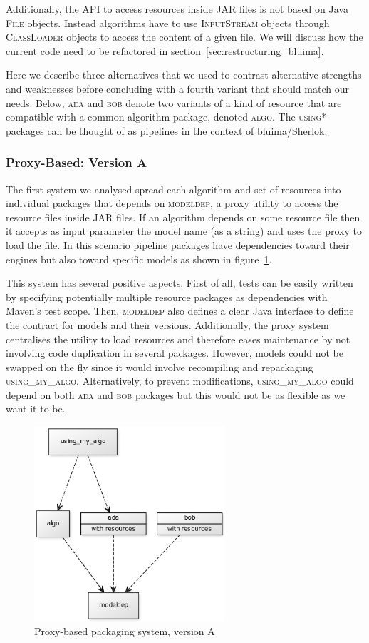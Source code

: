 \documentclass{article}
\newcommand{\ID}[1]{{\textsc{#1}}}
\newcommand{\JAR}{JAR\xspace}
\begin{document}
\begin{appendices}
Additionally, the API to access resources inside \JAR files is not based on Java \ID{File} objects.
Instead algorithms have to use \ID{InputStream} objects through \ID{ClassLoader} objects to access
the content of a given file. We will discuss how the current code need to be refactored in
section~\ref{sec:restructuring_bluima}.

Here we describe three alternatives that we used to contrast alternative strengths and weaknesses
before concluding with a fourth variant that should match our needs. Below, \ID{ada} and \ID{bob}
denote two variants of a kind of resource that are compatible with a common algorithm package,
denoted \ID{algo}. The \ID{using*} packages can be thought of as pipelines in the context of
bluima/Sherlok.

\subsubsection{Proxy-Based: Version A}

The first system we analysed spread each algorithm and set of resources into individual packages
that depends on \ID{modeldep}, a proxy utility to access the resource files inside \JAR files. If an
algorithm depends on some resource file then it accepts as input parameter the model name (as a
string) and uses the proxy to load the file. In this scenario pipeline packages have dependencies
toward their engines but also toward specific models as shown in figure~\ref{fig:pkgsysA}.

This system has several positive aspects. First of all, tests can be easily written by specifying
potentially multiple resource packages as dependencies with Maven's test scope. Then, \ID{modeldep}
also defines a clear Java interface to define the contract for models and their versions.
Additionally, the proxy system centralises the utility to load resources and therefore eases
maintenance by not involving code duplication in several packages. However, models could not be
swapped on the fly since it would involve recompiling and repackaging \ID{using\_my\_algo}.
Alternatively, to prevent modifications, \ID{using\_my\_algo} could depend on both \ID{ada} and
\ID{bob} packages but this would not be as flexible as we want it to be.

\begin{figure}
    \centering
    \includegraphics[width=200pt]{res/packaging_version_A.png}
    \caption{Proxy-based packaging system, version A}
    \label{fig:pkgsysA}
\end{figure}



\end{appendices}
\end{document}

